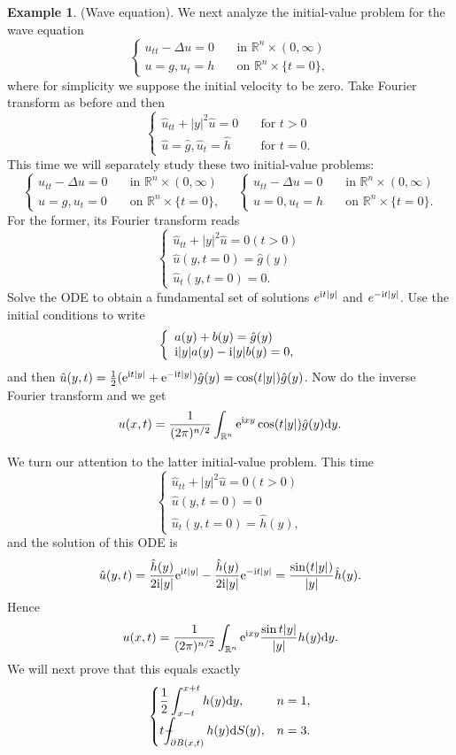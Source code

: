 \documentclass[hyperref,UTF8,12pt]{article}
\numberwithin{equation}{subsection}
\theoremstyle{plain}
\theoremstyle{definition}
\newtheorem{example}{Example}
\numberwithin{theorem}{section}
\numberwithin{lemma}{section}
\numberwithin{proposition}{section}
\numberwithin{remark}{section}
\numberwithin{corollary}{section}
\numberwithin{definition}{section}
\numberwithin{problem}{section}
\numberwithin{example}{section}
\def\e{\textup{e}}
\def\i{\textup{i}}
\def\dif{\textup{d}}
\def\Xint#1{\mathchoice
	{\XXint\displaystyle\textstyle{#1}}%
	{\XXint\textstyle\scriptstyle{#1}}%
	{\XXint\scriptstyle\scriptscriptstyle{#1}}%
	{\XXint\scriptscriptstyle\scriptscriptstyle{#1}}%
	\!\int}
\def\XXint#1#2#3{{\setbox0=\hbox{$#1{#2#3}{\int}$ }
		\vcenter{\hbox{$#2#3$ }}\kern-.55\wd0}}
\def\dashint{\Xint-}
\newcommand{\dis}{\displaystyle}
\newcommand{\ptl}{\partial}
\newcommand{\mr}{\mathbb{R}}
\begin{document}
\begin{example}
(Wave equation). We next analyze the initial-value problem for the wave equation \[
\left\{\begin{aligned}
	u_{tt}-\Delta u=0&\quad\text{in } \mr^n\times(0,\infty)\\
	u=g,u_t=h&\quad\text{on } \mr^n\times\{t=0\},
\end{aligned}\right.\]where for simplicity we suppose the initial velocity to be zero. Take Fourier transform as before and then \[\left\{\begin{aligned}
\hat{u}_{tt}+|y|^2\hat{u}=0&\quad\text{for } t>0\\
\hat{u}=\hat{g},\hat{u}_t=\hat{h}&\quad\text{for } t=0.
\end{aligned}\right.\]This time we will separately study these two initial-value problems:
\[\left\{\begin{aligned}
	u_{tt}-\Delta u=0&\quad\text{in } \mr^n\times(0,\infty)\\
	u=g,u_t=0&\quad\text{on } \mr^n\times\{t=0\},
\end{aligned}\right.\quad\left\{\begin{aligned}
	u_{tt}-\Delta u=0&\quad\text{in } \mr^n\times(0,\infty)\\
	u=0,u_t=h&\quad\text{on } \mr^n\times\{t=0\}.
\end{aligned}\right.\]For the former, its Fourier transform reads \[\left\{\begin{array}{l}
\hat{u}_{tt}+|y|^2\hat{u}=0(t>0)\\
\hat{u}(y,t=0)=\hat{g}(y)\\
\hat{u}_t(y,t=0)=0.
\end{array}\right.\]Solve the ODE to obtain a fundamental set of solutions $e^{\i t|y|}$ and $e^{-\i t|y|}$. Use the initial conditions to write \[\left\{\begin{array}{l}a(y)+b(y)=\hat{g}(y)\\ \i|y|a(y)-\i|y|b(y)=0,\end{array}\right.\] and then $\hat{u}(y,t)=\frac{1}{2}(\e^{\i t|y|}+\e^{-\i t|y|})\hat{g}(y)=\cos(t|y|)\hat{g} (y)$. Now do the inverse Fourier transform and we get\[u(x,t)=\frac{1}{(2\pi)^{n/2}}\int_
{\mr^n}\e^{\i xy}\cos(t|y|)\hat{g}(y)\dif y.\]

We turn our attention to the latter initial-value problem. This time\[\left\{\begin{array}{l}
	\hat{u}_{tt}+|y|^2\hat{u}=0(t>0)\\
	\hat{u}(y,t=0)=0\\
	\hat{u}_t(y,t=0)=\hat{h}(y),
\end{array}\right.\]and the solution of this ODE is \[\hat{u}(y,t)=\frac{\hat{h}(y)}{2\i|y|} \e^{\i t|y|}-\frac{\hat{h}(y)}{2\i|y|}\e^{-\i t|y|}=\frac{\sin(t|y|)}{|y|}\hat{h}(y).\]Hence\[
u(x,t)=\frac{1}{(2\pi)^{n/2}}\int_{\mr^n}\e^{\i xy}\frac{\sin t|y|}{|y|}h(y)\dif y.\]We will next prove that this equals exactly \[\begin{cases}
\dis\frac{1}{2}\int_{x-t}^{x+t}h(y)\dif y,&n=1,\\[6pt]
t\dis\dashint_{\ptl B(x,t)}h(y)\dif S(y),&n=3.
\end{cases}\]


\end{example}
\end{document}
